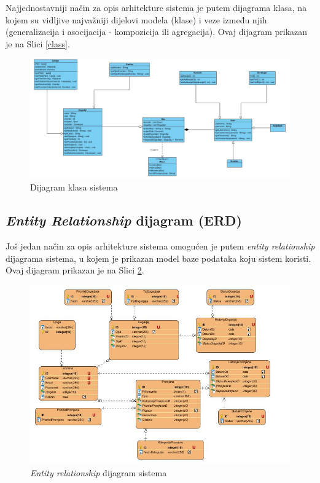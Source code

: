 \documentclass[12pt,a4paper]{article}
\begin{document}
Najjednostavniji način za opis arhitekture sistema je putem dijagrama klasa, na kojem su vidljive najvažniji dijelovi modela (klase) i veze između njih (generalizacija i asocijacija - kompozicija ili agregacija). Ovaj dijagram prikazan je na Slici \ref{class}.

\begin{figure}[H]
\center
\includegraphics[scale=0.45]{../res/class.JPG}
\caption{Dijagram klasa sistema}
\label{erd}
\end{figure}

\subsection{\textit{Entity Relationship} dijagram (ERD)}

Još jedan način za opis arhitekture sistema omogućen je putem \textit{entity relationship} dijagrama sistema, u kojem je prikazan model baze podataka koju sistem koristi. Ovaj dijagram prikazan je na Slici \ref{erd}.

\begin{figure}[H]
\center
\includegraphics[scale=0.5]{../res/erd.JPG}
\caption{\textit{Entity relationship} dijagram sistema}
\label{erd}
\end{figure}
\end{document}
